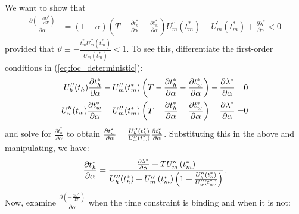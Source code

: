 \documentclass[12pt,a4paper,british]{article}
\makeatletter
\newenvironment{proof}[1][\proofname]{\par
    \normalfont\topsep6\p@\@plus6\p@\relax
    \trivlist
    \itemindent\parindent
    \item[\hskip\labelsep
          \scshape
      #1]\ignorespaces
  }{%
    \endtrivlist\@endpefalse
  }
\providecommand{\proofname}{Proof}
\makeatother
\begin{document}
\begin{proof}
We want to show that
\begin{align*}
\frac{\partial\left(-\frac{\mathrm{d}U^{\ast}}{\mathrm{d}T}\right)}{\partial\alpha} & =\left(1-\alpha\right)\left(T-\frac{\partial t_{h}^{\ast}}{\partial\alpha}-\frac{\partial t_{w}^{\ast}}{\partial\alpha}\right)U_{m}^{\prime\prime}\left(t_{m}^{\ast}\right)-U_{m}^{\prime}\left(t_{m}^{\ast}\right)+\frac{\partial\lambda^{\ast}}{\partial\alpha}<0
\end{align*}
provided that $\vartheta\equiv-\frac{t_{m}^{\ast}U_{m}^{\prime\prime}\left(t_{m}^{\ast}\right)}{U_{m}^{\prime}\left(t_{m}^{\ast}\right)}<1$. To see this, differentiate the first-order conditions in (\ref{eq:foc_deterministic}):
\begin{align*}
U_{h}^{\prime\prime}\text{\ensuremath{\left(t_{h}\right)}}\frac{\partial t_{h}^{\ast}}{\partial\alpha}-U_{m}^{\prime\prime}\text{\ensuremath{\left(t_{m}^{\ast}\right)}}\left(T-\frac{\partial t_{h}^{\ast}}{\partial\alpha}-\frac{\partial t_{w}^{\ast}}{\partial\alpha}\right)-\frac{\partial\lambda^{\ast}}{\partial\alpha}= & 0\\
U_{w}^{\prime\prime}\text{\ensuremath{\left(t_{w}\right)}}\frac{\partial t_{w}^{\ast}}{\partial\alpha}-U_{m}^{\prime\prime}\text{\ensuremath{\left(t_{m}^{\ast}\right)}}\left(T-\frac{\partial t_{h}^{\ast}}{\partial\alpha}-\frac{\partial t_{w}^{\ast}}{\partial\alpha}\right)-\frac{\partial\lambda^{\ast}}{\partial\alpha}= & 0
\end{align*}
and solve for $\frac{\partial t_{w}^{\ast}}{\partial\alpha}$ to obtain $\frac{\partial t_{w}^{\ast}}{\partial\alpha}=\frac{U_{h}^{\prime\prime}\text{\ensuremath{\left(t_{h}^{\ast}\right)}}}{U_{w}^{\prime\prime}\text{\ensuremath{\left(t_{w}^{\ast}\right)}}}\frac{\partial t_{h}^{\ast}}{\text{\ensuremath{\partial\alpha}}}$. Substituting this in the above and manipulating, we have: 
\begin{equation*}
\frac{\partial t_{h}^{\ast}}{\partial\alpha}=\frac{\frac{\partial\lambda^{\ast}}{\partial\alpha}+TU_{m}^{\prime\prime}\left(t_{m}^{\ast}\right)}{U_{h}^{\prime\prime}\text{\ensuremath{\left(t_{h}^{\ast}\right)}}+U_{m}^{\prime\prime}\left(t_{m}^{\ast}\right)\left(1+\frac{U_{h}^{\prime\prime}\text{\ensuremath{\left(t_{h}^{\ast}\right)}}}{U_{w}^{\prime\prime}\text{\ensuremath{\left(t_{w}^{\ast}\right)}}}\right)}.
\end{equation*}
Now, examine $\frac{\partial\left(-\frac{\mathrm{d}U^{\ast}}{\mathrm{d}T}\right)}{\partial\alpha}$ when the time constraint is binding and when it is not:

\end{proof}
\end{document}
